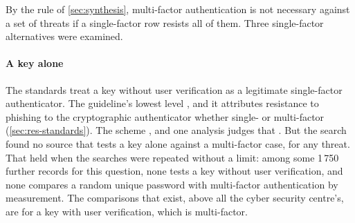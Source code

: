 By the rule of \cref{sec:synthesis}, multi-factor authentication is not
necessary against a set of threats if a single-factor row resists all
of them.
Three single-factor alternatives were examined.

\paragraph{A key alone}
The standards treat a key without user verification as a legitimate
single-factor authenticator.
The guideline's lowest level
, and it attributes resistance to phishing
to the cryptographic authenticator whether single- or multi-factor
(\cref{sec:res-standards}).
The scheme
, and one analysis judges that
.
But the search found no source that tests a key alone against a
multi-factor case, for any threat.
That held when the searches were repeated without a limit: among some
1\,750 further records for this question, none tests a key without
user verification, and none compares a random unique password with
multi-factor authentication by measurement.
The comparisons that exist, above all the cyber security centre's, are
for a key with user verification, which is multi-factor.


